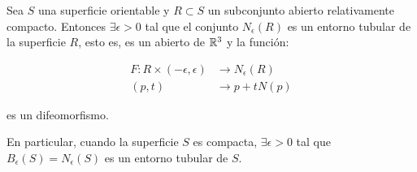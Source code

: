 \begin{theorem}
Sea $S$ una superficie orientable y $R \subset S$ un subconjunto abierto relativamente compacto. Entonces $\exists \epsilon > 0$ tal que el conjunto $N_\epsilon(R)$ es un entorno tubular de la superficie $R$, esto es, es un abierto de $\mathbb{R}^3$ y la función:

\begin{align*}
    F: R \times (-\epsilon, \epsilon) &\longrightarrow N_\epsilon(R) \\
    (p,t) &\longrightarrow p + tN(p)
\end{align*}

es un difeomorfismo.

En particular, cuando la superficie $S$ es compacta, $\exists \epsilon > 0$ tal que
$B_\epsilon(S)=N_\epsilon(S)$ es un entorno tubular de $S$.
\end{theorem}
